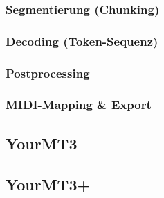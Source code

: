 \subsubsection*{Segmentierung (Chunking)}

\subsubsection*{Decoding (Token-Sequenz)}

\subsubsection*{Postprocessing}

\subsubsection*{MIDI-Mapping \& Export}

\subsection{YourMT3}

\subsection{YourMT3+}

